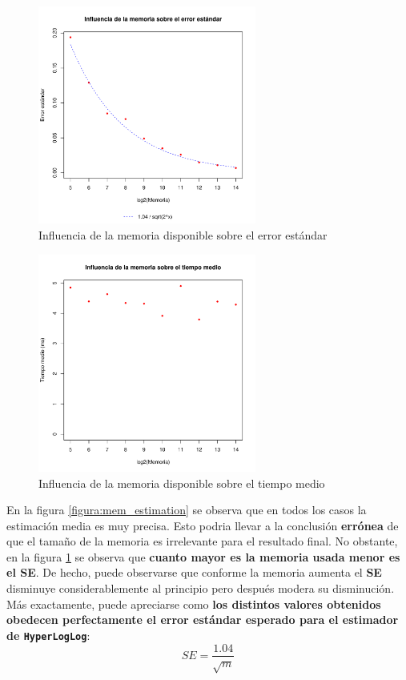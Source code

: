 \begin{figure}[h!]
    \centering
        \includegraphics[width=0.64\textwidth]{../figs/D1/mem_errors_rel.pdf}
        \caption{Influencia de la memoria disponible sobre el error estándar}
    \label{figura:mem_errors}
\end{figure}

\begin{figure}[h!]
    \centering
        \includegraphics[width=0.64\textwidth]{../figs/D1/mem_time_rel.pdf}
        \caption{Influencia de la memoria disponible sobre el tiempo medio}
    \label{figura:mem_time}
\end{figure}

\clearpage

En la figura \ref{figura:mem_estimation} se observa que en todos los casos la estimación media es muy precisa. Esto podria llevar a
la conclusión \textbf{errónea} de que el tamaño de la memoria es irrelevante para el resultado final. No obstante, en la figura
\ref{figura:mem_errors} se observa que \textbf{cuanto mayor es la memoria usada menor es el \textbf{SE}}.
De hecho, puede observarse
que conforme la memoria aumenta el \textbf{SE} disminuye considerablemente al principio pero después modera su disminución. Más exactamente, puede apreciarse como \textbf{los distintos valores obtenidos obedecen perfectamente el error estándar
esperado para el estimador de \texttt{HyperLogLog}}:
$$SE = \frac{1.04}{\sqrt{m}}$$

